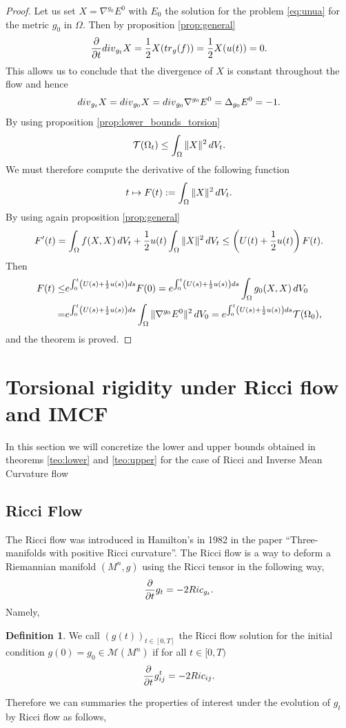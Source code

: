 \documentclass{amsart}
\theoremstyle{definition}
\newtheorem{definition}[theorem]{Definition}
\theoremstyle{remark}
\newcommand{\Ric}{{\rm Ric}}
\newcommand{\tr}{{\rm tr}}
\newcommand{\V}{{\rm V}}
\begin{document}
\begin{proof}
    Let us set $X=\nabla^{g_0}E^0$ with  $E_0$  the solution for the problem \eqref{eq:unua} for the metric $g_0$ in $\Omega$. Then by proposition \ref{prop:general} 
    $$
\begin{aligned}
    \frac{\partial}{\partial t}{\rm div}_{g_t}X=\frac{1}{2}X(\tr_g(f))=\frac{1}{2}X(u(t))=0.
\end{aligned}
    $$
    This allows us to conclude that the divergence of $X$ is constant throughout the flow and hence
    $$
{\rm div}_{g_t}X={\rm div}_{g_0}X={\rm div}_{g_0}\nabla^{g_0}E^0=\Delta_{g_0}E^0=-1.
    $$
    By using proposition \ref{prop:lower_bounds_torsion} 
    $$
\mathcal{T}(\Omega_t)\leq \int_{\Omega}\Vert X\Vert^2\, d\V_t.
    $$
    We must therefore compute the derivative of the following function
    $$
t\mapsto F(t):=\int_{\Omega}\Vert X\Vert^2\, d\V_t.
    $$
    By using again proposition \ref{prop:general}
    $$
\begin{aligned}
    F'(t)=\int_\Omega f(X,X)\, d\V_t+\frac{1}{2}u(t)\int_\Omega\Vert X\Vert^2\, d\V_t\leq \left(U(t)+\frac{1}{2}u(t)\right)F(t).
\end{aligned}
    $$
    Then 
    $$
    \begin{aligned}
        F(t)\leq &e^{\int_0^t\left(U(s)+\frac{1}{2}u(s)\right)ds}F(0)=
e^{\int_0^t\left(U(s)+\frac{1}{2}u(s)\right)ds}\int_{\Omega}g_0(X,X)\, d\V_0\\
=&
e^{\int_0^t\left(U(s)+\frac{1}{2}u(s)\right)ds}\int_{\Omega}\Vert \nabla^{g_0}E^0\Vert^2\, dV_0=e^{\int_0^t\left(U(s)+\frac{1}{2}u(s)\right)ds}\mathcal{T}(\Omega_0),
    \end{aligned}
    $$
    and the theorem is proved.
\end{proof}
\section{Torsional rigidity under Ricci flow and IMCF}\label{sec:cinc} In this section we will concretize the lower and upper bounds obtained in theorems \ref{teo:lower} and \ref{teo:upper} for the case of Ricci and Inverse Mean Curvature flow
\subsection{Ricci Flow}
The Ricci flow was introduced in Hamilton's in 1982 in the paper ``Three-manifolds with positive Ricci curvature''.
The Ricci flow is a way to deform a Riemannian manifold $(M^n,g)$ using the Ricci tensor in the following way, 
    $$
\frac{\partial}{\partial t}g_t=-2\Ric_{g_t}.
$$
Namely,
\begin{definition}\cite{Andrews}
    We call $(g(t))_{t\in [0,T]}$ the Ricci flow solution for the initial condition $g(0)=g_0 \in \mathcal{M}(M^n)$ if for all $t\in [0,T)$ 
    $$
\frac{\partial}{\partial t}g^t_{ij}=-2{\rm Ric}_{ij}.
$$
\end{definition}
Therefore we can summaries the properties of interest under the evolution of $g_t$ by Ricci flow as follows, 
\end{document}
